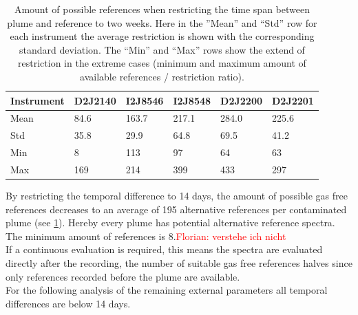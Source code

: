 \begin{table}[h]
	\centering
	\begin{tabular}{p{1.8cm}|p{2.15cm}p{2.15cm}p{2.15cm}p{2.15cm}p{2.15cm}|}
		Instrument	&D2J2140&I2J8546& I2J8548&D2J2200&D2J2201\\
		\toprule
		Mean&84.6 &163.7 &217.1&284.0 &225.6 \\
		\midrule
		Std&
		35.8&%
		29.9&%
		64.8&%
		69.5&%
		41.2\\%
		\midrule
		Min&
		8 &%
		113&%
		97 &%
		64&%
		63\\%
		\midrule
		Max&
		169&%
		214&%
		399&%
		433&%
		297\\%
		\bottomrule
	\end{tabular}
	\caption{Amount of possible references when restricting the time span between plume and reference to two weeks. Here in the ”Mean” and “Std” row for each  instrument the average restriction is shown with the corresponding standard deviation. The “Min” and “Max” rows show the extend of restriction in the extreme cases (minimum and maximum amount of available references / restriction ratio).}
	\label{Tab:refstime}
\end{table}	
By restricting the temporal difference to 14 days, the amount of possible gas free references decreases to an average of 195 alternative references per contaminated plume (see \cref{Tab:refstime}). Hereby every plume has potential alternative reference spectra. The minimum amount of references is 8.\textcolor{red}{Florian: verstehe ich nicht}\\
If a continuous evaluation is required, this means the spectra are evaluated directly after the recording, the number of suitable gas free references halves since only references recorded before the plume are available.\\
For the following analysis of the remaining external parameters all temporal differences are below 14 days.
